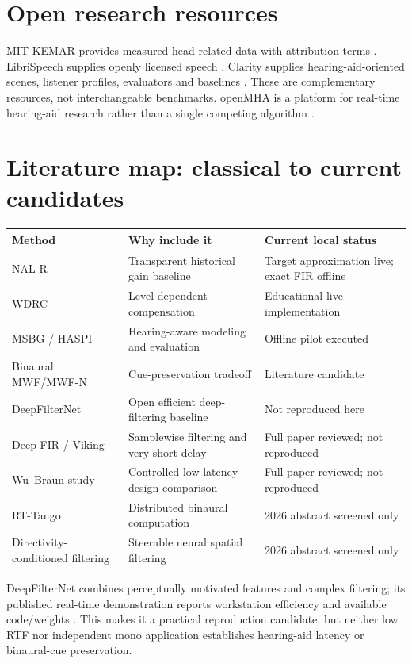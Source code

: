 \documentclass[11pt,a4paper]{article}
\begin{document}
\section{Open research resources}
MIT KEMAR provides measured head-related data with attribution terms \cite{kemar}. LibriSpeech supplies openly licensed speech \cite{librispeech}. Clarity supplies hearing-aid-oriented scenes, listener profiles, evaluators and baselines \cite{clarity}. These are complementary resources, not interchangeable benchmarks. openMHA is a platform for real-time hearing-aid research rather than a single competing algorithm \cite{openmha}.
\newpage
\section{Literature map: classical to current candidates}
\begin{tabularx}{\linewidth}{@{}p{.24\linewidth}YY@{}}\toprule
Method & Why include it & Current local status\\\midrule
NAL-R \cite{nalr} & Transparent historical gain baseline & Target approximation live; exact FIR offline\\
WDRC \cite{kates2005} & Level-dependent compensation & Educational live implementation\\
MSBG / HASPI \cite{clarity,haspi} & Hearing-aware modeling and evaluation & Offline pilot executed\\
Binaural MWF/MWF-N \cite{mwf} & Cue-preservation tradeoff & Literature candidate\\
DeepFilterNet \cite{dfn} & Open efficient deep-filtering baseline & Not reproduced here\\
Deep FIR / Viking \cite{deepfir} & Samplewise filtering and very short delay & Full paper reviewed; not reproduced\\
Wu--Braun study \cite{wu2025} & Controlled low-latency design comparison & Full paper reviewed; not reproduced\\
RT-Tango \cite{rttango} & Distributed binaural computation & 2026 abstract screened only\\
Directivity-conditioned filtering \cite{uphaus} & Steerable neural spatial filtering & 2026 abstract screened only\\\bottomrule
\end{tabularx}

DeepFilterNet combines perceptually motivated features and complex filtering; its published real-time demonstration reports workstation efficiency and available code/weights \cite{dfn}. This makes it a practical reproduction candidate, but neither low RTF nor independent mono application establishes hearing-aid latency or binaural-cue preservation.
\end{document}
